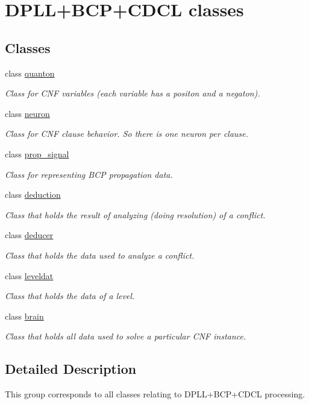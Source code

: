 \hypertarget{group__docgrp___c_d_c_l__classes}{}\section{D\+P\+L\+L+\+B\+C\+P+\+C\+D\+CL classes}
\label{group__docgrp___c_d_c_l__classes}
\subsection*{Classes}
\begin{DoxyCompactItemize}
\item 
class \hyperlink{classquanton}{quanton}
\begin{DoxyCompactList}\small\item\em Class for C\+NF variables (each variable has a positon and a negaton). \end{DoxyCompactList}\item 
class \hyperlink{classneuron}{neuron}
\begin{DoxyCompactList}\small\item\em Class for C\+NF clause behavior. So there is one neuron per clause. \end{DoxyCompactList}\item 
class \hyperlink{classprop__signal}{prop\+\_\+signal}
\begin{DoxyCompactList}\small\item\em Class for representing B\+CP propagation data. \end{DoxyCompactList}\item 
class \hyperlink{classdeduction}{deduction}
\begin{DoxyCompactList}\small\item\em Class that holds the result of analyzing (doing resolution) of a conflict. \end{DoxyCompactList}\item 
class \hyperlink{classdeducer}{deducer}
\begin{DoxyCompactList}\small\item\em Class that holds the data used to analyze a conflict. \end{DoxyCompactList}\item 
class \hyperlink{classleveldat}{leveldat}
\begin{DoxyCompactList}\small\item\em Class that holds the data of a level. \end{DoxyCompactList}\item 
class \hyperlink{classbrain}{brain}
\begin{DoxyCompactList}\small\item\em Class that holds all data used to solve a particular C\+NF instance. \end{DoxyCompactList}\end{DoxyCompactItemize}


\subsection{Detailed Description}
This group corresponds to all classes relating to D\+P\+L\+L+\+B\+C\+P+\+C\+D\+CL processing. 